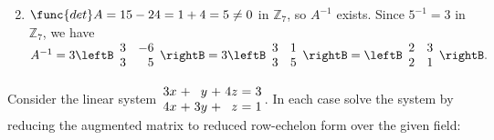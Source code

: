 \begin{multicols}{2}
\begin{ex}
\begin{enumerate}[label={\alph*.}]
\end{enumerate}
\begin{sol}
\begin{enumerate}[label={\alph*.}]
\setcounter{enumi}{1}
\item  $\func{det} A = 15 - 24 = 1 + 4 = 5 \neq 0$ in $\mathbb{Z}_{7}$, so $A^{-1}$ exists. Since $5^{-1} = 3$ in $\mathbb{Z}_{7}$, we have
$A^{-1} = 3\leftB \begin{array}{rr}
3 & -6 \\
3 & 5 
\end{array}\rightB = 3\leftB \begin{array}{rr}
3 & 1 \\
3 & 5 
\end{array}\rightB = \leftB \begin{array}{rr}
2 & 3 \\
2 & 1 
\end{array}\rightB.$
\end{enumerate}
\end{sol}
\end{ex}

\begin{ex}
Consider the linear system $\arraycolsep=1.5pt \begin{array}{rrrrrrr}
3x & + & y & + & 4z & = & 3 \\
4x & + & 3y & + & z & = & 1 
\end{array}$. In each case solve the system by reducing the augmented matrix to reduced row-echelon form over the given field:


\end{ex}
\end{multicols}
